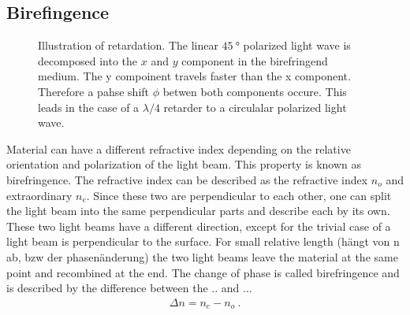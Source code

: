\subsection{Birefingence}
%
\begin{figure}[!t]
\centering
\setlength{\tikzwidth}{\textwidth}
\caption{Illustration of retardation. The linear $\SI{45}{\degree}$ polarized light wave is decomposed into the $x$ and $y$ component in the birefringend medium. The y compoinent travels faster than the x component. Therefore a pahse shift $\phi$ betwen both components occure. This leads in the case of a $\lambda/4$ retarder to a circulalar polarized light wave. }
\label{fig:optic_retardation}
\end{figure}
% 
% 
Material can have a different refractive index depending on the relative orientation and polarization of the light beam.
This property is known as birefringence.
The refractive index can be described as the refractive index $n_o$ and extraordinary  $n_e$.
Since these two are perpendicular to each other, one can split the light beam into the same perpendicular parts and describe each by its own.
These two light beams have a different direction, except for the trivial case of a light beam is perpendicular to the surface.
For small relative length (hängt von n ab, bzw der phasenänderung) the two light beams leave the material at the same point and recombined at the end.
The change of phase is called birefringence and is described by the difference between the .. and ...
% 
\begin{align}
    \Delta n = n_e - n_o \> .
\end{align}
% 
% 
% 
% 
